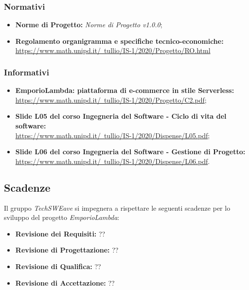        \subsubsection{Normativi}
        \begin{itemize}
            \item \textbf{Norme di Progetto: } \emph{Norme di Progetto v1.0.0};
            \item \textbf{Regolamento organigramma e specifiche tecnico-economiche: } \\ \href{https://www.math.unipd.it/~tullio/IS-1/2020/Progetto/RO.html}{https://www.math.unipd.it/~tullio/IS-1/2020/Progetto/RO.html}
        \end{itemize}
        \subsubsection{Informativi}
        \begin{itemize}
            \item \textbf{EmporioLambda: piattaforma di e-commerce in stile Serverless: } \\ \href{https://www.math.unipd.it/~tullio/IS-1/2020/Progetto/C2.pdf}{https://www.math.unipd.it/~tullio/IS-1/2020/Progetto/C2.pdf};
            \item \textbf{Slide L05 del corso Ingegneria del Software - Ciclo di vita del software: } \\ \href{https://www.math.unipd.it/~tullio/IS-1/2020/Dispense/L05.pdf}{https://www.math.unipd.it/~tullio/IS-1/2020/Dispense/L05.pdf};
            \item \textbf{Slide L06 del corso Ingegneria del Software - Gestione di Progetto: } \\ \href{https://www.math.unipd.it/~tullio/IS-1/2020/Dispense/L06.pdf}{https://www.math.unipd.it/~tullio/IS-1/2020/Dispense/L06.pdf}.
        \end{itemize}
    \subsection{Scadenze}
    Il gruppo \emph{TechSWEave} si impegnera a rispettare le seguenti scadenze per lo sviluppo del progetto \emph{EmporioLambda}:
    \begin{itemize}
        \item \textbf{Revisione dei Requisiti: }??
        \item \textbf{Revisione di Progettazione: }??
        \item \textbf{Revisione di Qualifica: }??
        \item \textbf{Revisione di Accettazione: }??
    \end{itemize}
